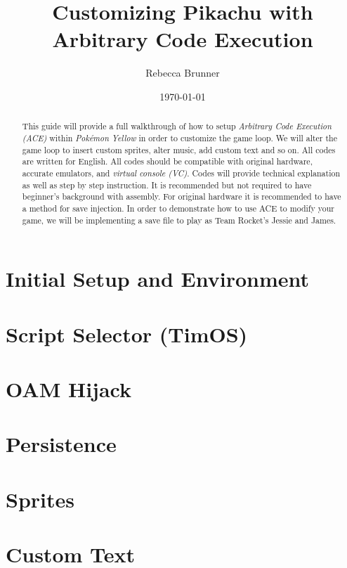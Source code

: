 \documentclass[12pt]{article}
\title{Customizing Pikachu with Arbitrary Code Execution}
\author{Rebecca Brunner}
\date{\today}
\newcommand{\selector}{TimOS}
\begin{document}
    \begin{titlepage}
        \vspace*{\fill}
        \vbox{
            \clearpage
            \maketitle
            \thispagestyle{empty}
        }
        \vspace*{\fill}
        \vspace*{\fill}
    \end{titlepage}

    \begin{abstract}
        This guide will provide a full walkthrough of how to setup \textit{Arbitrary Code Execution (ACE)} within \textit{Pokémon Yellow} in order to customize the game loop.  We will alter the game loop to insert custom sprites, alter music, add custom text and so on.  All codes are written for English.  All codes should be compatible with original hardware, accurate emulators, and \textit{virtual console (VC)}.  Codes will provide technical explanation as well as step by step instruction.  It is recommended but not required to have beginner's background with assembly.  For original hardware it is recommended to have a method for save injection.  In order to demonstrate how to use ACE to modify your game, we will be implementing a save file to play as Team Rocket's Jessie and James.
    \end{abstract}

    \tableofcontents

    \newpage

    \section{Initial Setup and Environment}
    
    \newpage

    \section{Script Selector (\selector{})}
    
    \newpage

    \section{OAM Hijack}
    
    \newpage

    \section{Persistence}
    
    \newpage

    \section{Sprites}
    
    \newpage

    \section{Custom Text}
    
    \newpage

    \printbibliography
\end{document}
